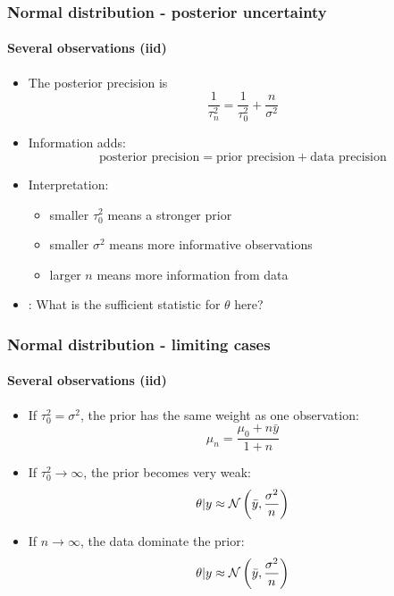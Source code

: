 \documentclass[10pt]{beamer}
\begin{document}
\begin{frame}
\frametitle{Normal distribution - posterior uncertainty}
\framesubtitle{Several observations (iid)}

\begin{itemize}
  \item The posterior precision is
  \[
    \frac{1}{\tau_n^2}
    =
    \frac{1}{\tau_0^2}
    +
    \frac{n}{\sigma^2}
  \]
  \pause
  \item Information adds:
  \[
    \text{posterior precision}
    =
    \text{prior precision}
    +
    \text{data precision}
  \]
  \pause
  \item Interpretation:
  \begin{itemize}
    \item smaller $\tau_0^2$ means a stronger prior
    \item smaller $\sigma^2$ means more informative observations
    \item larger $n$ means more information from data
  \end{itemize}
  \pause
  \item {}: What is the sufficient statistic for
    $\theta$ here?
\end{itemize}

\end{frame}

\begin{frame}
\frametitle{Normal distribution - limiting cases}
\framesubtitle{Several observations (iid)}

\begin{itemize}
  \item If $\tau_0^2=\sigma^2$, the prior has the same weight as one observation:
  \[
    \mu_n = \frac{\mu_0+n\bar{y}}{1+n}
  \]
  \pause
  \item If $\tau_0^2\rightarrow\infty$, the prior becomes very weak:
  \[
    \theta|y \approx \mathcal{N}\left(\bar{y},\frac{\sigma^2}{n}\right)
  \]
  \pause
  \item If $n\rightarrow\infty$, the data dominate the prior:
  \[
    \theta|y \approx \mathcal{N}\left(\bar{y},\frac{\sigma^2}{n}\right)
  \]
\end{itemize}

\end{frame}
\end{document}
